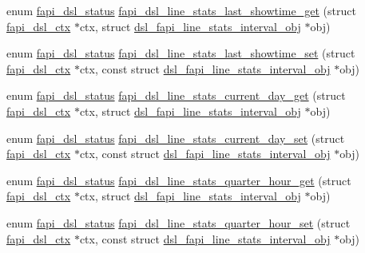 \begin{DoxyCompactItemize}
\item 
enum \hyperlink{group__FAPI__DSL_ga6a68d961535e6f7aa239751763131a70}{fapi\-\_\-dsl\-\_\-status} \hyperlink{group__FAPI__DSL_ga4723935e967f7789a3d44db21f3a407e}{fapi\-\_\-dsl\-\_\-line\-\_\-stats\-\_\-last\-\_\-showtime\-\_\-get} (struct \hyperlink{structfapi__dsl__ctx}{fapi\-\_\-dsl\-\_\-ctx} $\ast$ctx, struct \hyperlink{structdsl__fapi__line__stats__interval__obj}{dsl\-\_\-fapi\-\_\-line\-\_\-stats\-\_\-interval\-\_\-obj} $\ast$obj)
\item 
enum \hyperlink{group__FAPI__DSL_ga6a68d961535e6f7aa239751763131a70}{fapi\-\_\-dsl\-\_\-status} \hyperlink{group__FAPI__DSL_gac4cafc674b7543bc08e7bb82450b2245}{fapi\-\_\-dsl\-\_\-line\-\_\-stats\-\_\-last\-\_\-showtime\-\_\-set} (struct \hyperlink{structfapi__dsl__ctx}{fapi\-\_\-dsl\-\_\-ctx} $\ast$ctx, const struct \hyperlink{structdsl__fapi__line__stats__interval__obj}{dsl\-\_\-fapi\-\_\-line\-\_\-stats\-\_\-interval\-\_\-obj} $\ast$obj)
\item 
enum \hyperlink{group__FAPI__DSL_ga6a68d961535e6f7aa239751763131a70}{fapi\-\_\-dsl\-\_\-status} \hyperlink{group__FAPI__DSL_ga9f7d43e38ed54800ff6508eecc503511}{fapi\-\_\-dsl\-\_\-line\-\_\-stats\-\_\-current\-\_\-day\-\_\-get} (struct \hyperlink{structfapi__dsl__ctx}{fapi\-\_\-dsl\-\_\-ctx} $\ast$ctx, struct \hyperlink{structdsl__fapi__line__stats__interval__obj}{dsl\-\_\-fapi\-\_\-line\-\_\-stats\-\_\-interval\-\_\-obj} $\ast$obj)
\item 
enum \hyperlink{group__FAPI__DSL_ga6a68d961535e6f7aa239751763131a70}{fapi\-\_\-dsl\-\_\-status} \hyperlink{group__FAPI__DSL_gaf6a1f45e9dd5b8af61b25b17d9d9ce43}{fapi\-\_\-dsl\-\_\-line\-\_\-stats\-\_\-current\-\_\-day\-\_\-set} (struct \hyperlink{structfapi__dsl__ctx}{fapi\-\_\-dsl\-\_\-ctx} $\ast$ctx, const struct \hyperlink{structdsl__fapi__line__stats__interval__obj}{dsl\-\_\-fapi\-\_\-line\-\_\-stats\-\_\-interval\-\_\-obj} $\ast$obj)
\item 
enum \hyperlink{group__FAPI__DSL_ga6a68d961535e6f7aa239751763131a70}{fapi\-\_\-dsl\-\_\-status} \hyperlink{group__FAPI__DSL_ga735da13abce1e87ea66d972db590f8d9}{fapi\-\_\-dsl\-\_\-line\-\_\-stats\-\_\-quarter\-\_\-hour\-\_\-get} (struct \hyperlink{structfapi__dsl__ctx}{fapi\-\_\-dsl\-\_\-ctx} $\ast$ctx, struct \hyperlink{structdsl__fapi__line__stats__interval__obj}{dsl\-\_\-fapi\-\_\-line\-\_\-stats\-\_\-interval\-\_\-obj} $\ast$obj)
\item 
enum \hyperlink{group__FAPI__DSL_ga6a68d961535e6f7aa239751763131a70}{fapi\-\_\-dsl\-\_\-status} \hyperlink{group__FAPI__DSL_gae1d90b50a2166be4d8679438d71045dd}{fapi\-\_\-dsl\-\_\-line\-\_\-stats\-\_\-quarter\-\_\-hour\-\_\-set} (struct \hyperlink{structfapi__dsl__ctx}{fapi\-\_\-dsl\-\_\-ctx} $\ast$ctx, const struct \hyperlink{structdsl__fapi__line__stats__interval__obj}{dsl\-\_\-fapi\-\_\-line\-\_\-stats\-\_\-interval\-\_\-obj} $\ast$obj)

\end{DoxyCompactItemize}

